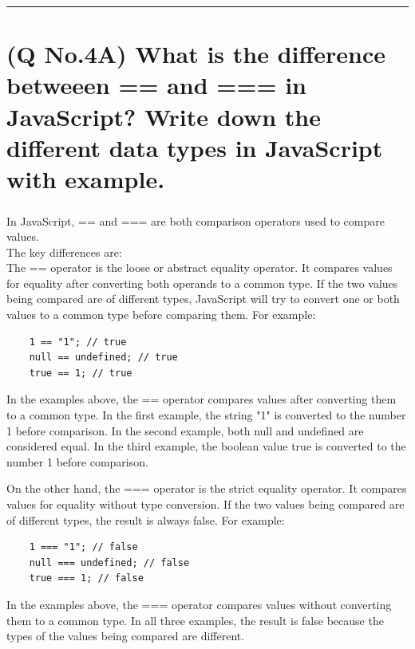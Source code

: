 \documentclass[11pt]{article}
\begin{document}
\noindent\rule{\linewidth}{0.4pt}
\section{(Q No.4A) What is the difference betweeen == and === in JavaScript? Write down the different data types in JavaScript with example.} 
\subparagraph{}
In JavaScript, == and === are both comparison operators used to compare values. \\
The key differences are:\\
The == operator is the loose or abstract equality operator. It compares values for equality after converting both operands to a common type. If the two values being compared are of different types, JavaScript will try to convert one or both values to a common type before comparing them. For example:
\begin{lstlisting}
    1 == "1"; // true
    null == undefined; // true
    true == 1; // true
\end{lstlisting}
In the examples above, the == operator compares values after converting them to a common type. In the first example, the string "1" is converted to the number 1 before comparison. In the second example, both null and undefined are considered equal. In the third example, the boolean value true is converted to the number 1 before comparison.

On the other hand, the === operator is the strict equality operator. It compares values for equality without type conversion. If the two values being compared are of different types, the result is always false. For example:
\begin{lstlisting}
    1 === "1"; // false
    null === undefined; // false
    true === 1; // false
\end{lstlisting}
In the examples above, the === operator compares values without converting them to a common type. In all three examples, the result is false because the types of the values being compared are different.
\end{document}
